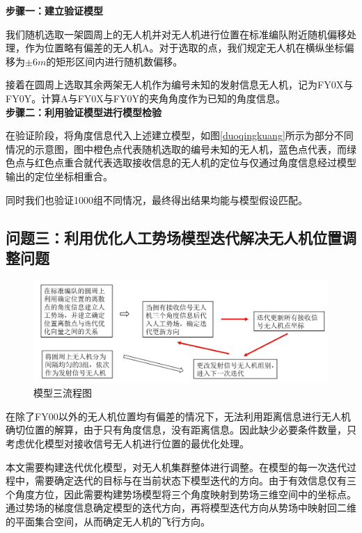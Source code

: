 \documentclass{my_paper}
\begin{document}
\textbf{步骤一：建立验证模型}

我们随机选取一架圆周上的无人机并对无人机进行位置在标准编队附近随机偏移处理，作为位置略有偏差的无人机A。对于选取的点，我们规定无人机在横纵坐标偏移为$\pm6m$的矩形区间内进行随机数偏移。

接着在圆周上选取其余两架无人机作为编号未知的发射信息无人机，记为FY0X与FY0Y。计算A与FY0X与FY0Y的夹角角度作为已知的角度信息。\\

\textbf{步骤二：利用验证模型进行模型检验}

在验证阶段，将角度信息代入上述建立模型，如图\ref{duoqingkuang}所示为部分不同情况的示意图，图中橙色点代表随机选取的编号未知的无人机，蓝色点代表，而绿色点与红色点重合就代表选取接收信息的无人机的定位与仅通过角度信息经过模型输出的定位坐标相重合。

同时我们也验证1000组不同情况，最终得出结果均能与模型假设匹配。



\subsection{问题三：利用优化人工势场模型迭代解决无人机位置调整问题}


\begin{figure}[h]
    \centering
    \includegraphics[width=1\textwidth]{wentisan.jpg}
    \caption{模型三流程图}
    \label{moxingsan}
\end{figure}

在除了FY00以外的无人机位置均有偏差的情况下，无法利用距离信息进行无人机确切位置的解算，由于只有角度信息，没有距离信息。因此缺少必要条件数量，只考虑优化模型对接收信号无人机进行位置的最优化处理。

本文需要构建迭代优化模型，对无人机集群整体进行调整。在模型的每一次迭代过程中，需要确定迭代的目标与在当前状态下模型迭代的方向。由于有效信息仅有三个角度方位，因此需要构建势场模型将三个角度映射到势场三维空间中的坐标点。通过势场的梯度信息确定模型的迭代方向，再将模型迭代方向从势场中映射回二维的平面集合空间，从而确定无人机的飞行方向。
\end{document}
